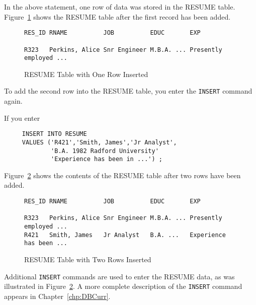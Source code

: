 In the above statement, one row of data was stored in the RESUME
table.  Figure~\ref{fig:InsTab} shows the RESUME table after the first
record has been added.

\begin{figure}
\caption{RESUME Table with One Row Inserted}{\label{fig:InsTab}}
\begin{screen}
\begin{verbatim}
RES_ID RNAME          JOB          EDUC       EXP

R323   Perkins, Alice Snr Engineer M.B.A. ... Presently employed ...

\end{verbatim}
\end{screen}
\end{figure}

To add the second row into the RESUME table, you enter the \verb`INSERT`
command again.

If you enter
\begin{verbatim}
     INSERT INTO RESUME
     VALUES ('R421','Smith, James','Jr Analyst',
             'B.A. 1982 Radford University'
             'Experience has been in ...') ;
\end{verbatim}

Figure~\ref{fig:Ins2Tab} shows the contents of the RESUME table after
two rows have been added.

\begin{figure}
\caption{RESUME Table with Two Rows Inserted}{\label{fig:Ins2Tab}}
\begin{screen}
\begin{verbatim}
RES_ID RNAME          JOB          EDUC       EXP

R323   Perkins, Alice Snr Engineer M.B.A. ... Presently employed ...
R421   Smith, James   Jr Analyst   B.A. ...   Experience has been ...

\end{verbatim}
\end{screen}
\end{figure}

Additional \verb`INSERT` commands are used to enter the RESUME data, as was
illustrated in Figure~\ref{fig:Ins2Tab}.  A more complete description
of the \verb`INSERT` command appears in Chapter~\ref{chp:DBCurr}.

